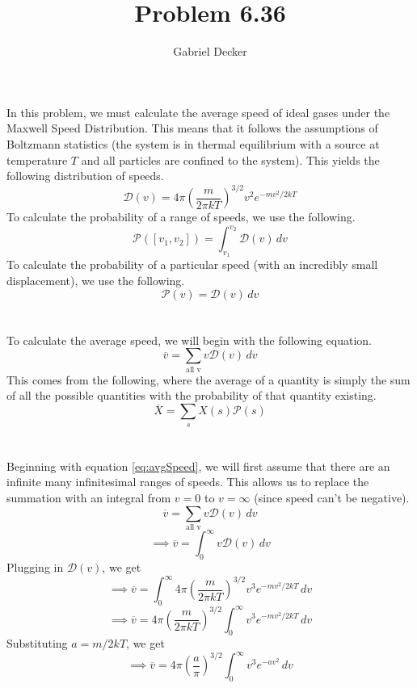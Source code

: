 \documentclass[12pt]{article}
\title{Problem 6.36}
\author{Gabriel Decker}
\begin{document}
\maketitle
\begin{flushleft}


In this problem, we must calculate the average speed of ideal gases under the Maxwell Speed Distribution.
This means that it follows the assumptions of Boltzmann statistics (the system is in thermal equilibrium with a source at temperature $T$ and all particles are confined to the system).
This yields the following distribution of speeds.
\begin{equation}
    \mathcal{D}(v)=4\pi\left(\frac{m}{2\pi kT}\right)^{3/2}v^2e^{-mv^2/2kT}
\end{equation}
To calculate the probability of a range of speeds, we use the following.
\begin{equation}
    \mathcal{P}([v_1,v_2])=\int_{v_1}^{v_2}\mathcal{D}(v)\,dv
\end{equation}
    To calculate the probability of a particular speed (with an incredibly small displacement), we use the following.
\begin{equation}
    \mathcal{P}(v)=\mathcal{D}(v)\,dv
\end{equation}\\~\\

To calculate the average speed, we will begin with the following equation.
\begin{equation}
    \overline{v}=\sum_\text{all v}v\mathcal{D}(v)\,dv
    \label{eq:avgSpeed}
\end{equation}
This comes from the following, where the average of a quantity is simply the sum of all the possible quantities with the probability of that quantity existing.
\begin{equation}
    \overline{X}=\sum_sX(s)\mathcal{P}(s)
\end{equation}\\~\\

Beginning with equation \ref{eq:avgSpeed}, we will first assume that there are an infinite many infinitesimal ranges of speeds. This allows us to replace the summation with an integral from $v=0$ to $v=\infty$ (since speed can't be negative).
$$\overline{v}=\sum_\text{all v}v\mathcal{D}(v)\,dv$$
$$\implies\overline{v}=\int_0^\infty v\mathcal{D}(v)\,dv$$
Plugging in $\mathcal{D}(v)$, we get
$$\implies\overline{v}=\int_0^\infty 4\pi\left(\frac{m}{2\pi kT}\right)^{3/2}v^3e^{-mv^2/2kT}\,dv$$
$$\implies\overline{v}=4\pi\left(\frac{m}{2\pi kT}\right)^{3/2}\int_0^\infty v^3e^{-mv^2/2kT}\,dv$$
Substituting $a=m/2kT$, we get
$$\implies\overline{v}=4\pi\left(\frac{a}{\pi}\right)^{3/2}\int_0^\infty v^3e^{-av^2}\,dv$$\\~\\


\end{flushleft}
\end{document}
